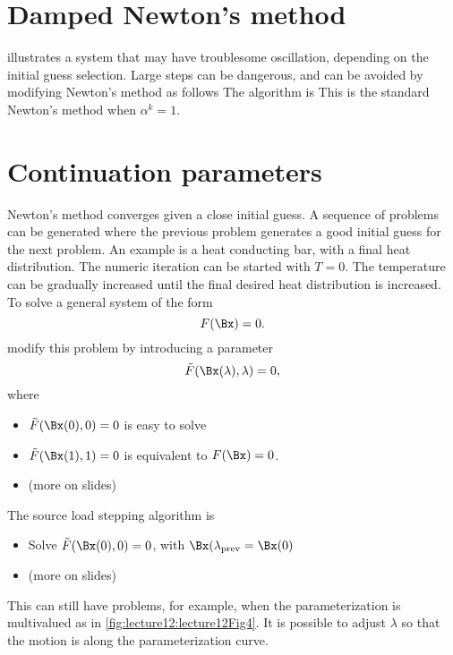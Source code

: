 %
%
%
\section{Damped Newton's method}
%
 illustrates a system that may have troublesome oscillation, depending on the initial guess selection.
%
%
%
Large steps can be dangerous, and can be avoided by modifying Newton's method as follows
%
The algorithm is
%
This is the standard Newton's method when \( \alpha^k = 1 \).
%
\section{Continuation parameters}
%
Newton's method converges given a close initial guess.  A sequence of problems can be generated where the previous problem generates a good initial guess for the next problem.
%
An example is a heat conducting bar, with a final heat distribution.  The numeric iteration can be started with \( T = 0 \).  The temperature can be gradually increased until the final desired heat distribution is increased.
%
To solve a general system of the form
%
\begin{equation}\label{eqn:multiphysicsL12:340}
F(\Bx) = 0.
\end{equation}
%
modify this problem by introducing a parameter
%
\begin{equation}\label{eqn:multiphysicsL12:360}
\tilde{F}(\Bx(\lambda), \lambda) = 0,
\end{equation}
%
where
%
\begin{itemize}
\item \( \tilde{F}(\Bx(0), 0) = 0 \) is easy to solve
\item \( \tilde{F}(\Bx(1), 1) = 0 \) is equivalent to \( F(\Bx) = 0 \).
\item (more on slides)
\end{itemize}
%
The source load stepping algorithm is
%
\begin{itemize}
\item Solve \(\tilde{F}(\Bx(0), 0) = 0 \), with \( \Bx(\lambda_{\text{prev}} = \Bx(0) \)
\item (more on slides)
\end{itemize}
%
This can still have problems, for example, when the parameterization is multivalued as in \cref{fig:lecture12:lecture12Fig4}.
%
%
It is possible to adjust \( \lambda \) so that the motion is along the parameterization curve.
%
